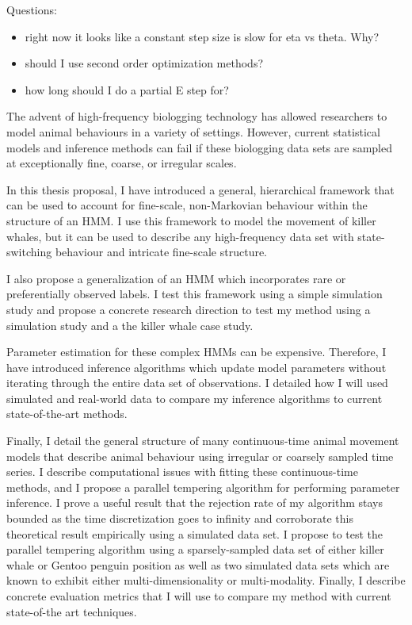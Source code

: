 
Questions:

\begin{itemize}
    \item right now it looks like a constant step size is slow for eta vs theta. Why?
    \item should I use second order optimization methods?
    \item how long should I do a partial E step for?
\end{itemize}

\iffalse
The advent of high-frequency biologging technology has allowed researchers to model animal behaviours in a variety of settings. However, current statistical models and inference methods can fail if these biologging data sets are sampled at exceptionally fine, coarse, or irregular scales.

In this thesis proposal, I have introduced a general, hierarchical framework that can be used to account for fine-scale, non-Markovian behaviour within the structure of an HMM. I use this framework to model the movement of killer whales, but it can be used to describe any high-frequency data set with state-switching behaviour and intricate fine-scale structure. 

I also propose a generalization of an HMM which incorporates rare or preferentially observed labels. I test this framework using a simple simulation study and propose a concrete research direction to test my method using a simulation study and a the killer whale case study.

Parameter estimation for these complex HMMs can be expensive. Therefore, I have introduced inference algorithms which update model parameters without iterating through the entire data set of observations. I detailed how I will used simulated and real-world data to compare my inference algorithms to current state-of-the-art methods.

Finally, I detail the general structure of many continuous-time animal movement models that describe animal behaviour using irregular or coarsely sampled time series. I describe computational issues with fitting these continuous-time methods, and I propose a parallel tempering algorithm for performing parameter inference. I prove a useful result that the rejection rate of my algorithm stays bounded as the time discretization goes to infinity and corroborate this theoretical result empirically using a simulated data set. I propose to test the parallel tempering algorithm using a sparsely-sampled data set of either killer whale or Gentoo penguin position as well as two simulated data sets which are known to exhibit either multi-dimensionality or multi-modality. Finally, I describe concrete evaluation metrics that I will use to compare my method with current state-of-the art techniques.

